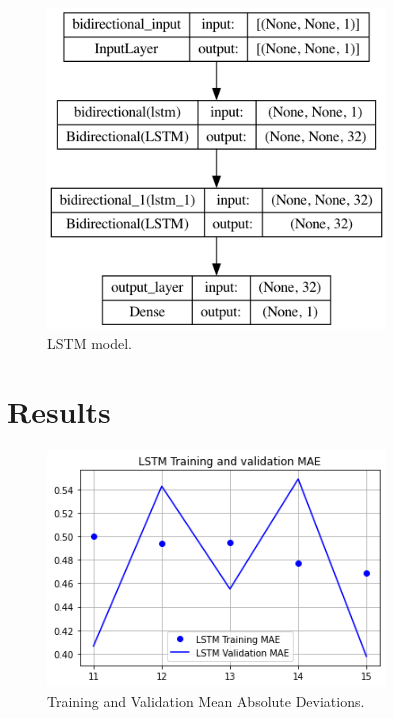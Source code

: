 \documentclass[twoside]{article}
\begin{document}
\begin{figure}
\centering
\includegraphics[width=0.8\textwidth]{2.png}
\caption[]{ 
  LSTM model. 
  }
\vspace{1mm}
\label{z2}
\end{figure}

\section{\label{sec3}Results}

\begin{figure}
\centering
\includegraphics[width=0.8\textwidth]{3.png}
\caption[]{ 
  Training and Validation Mean Absolute Deviations.
  }
\vspace{1mm}
\label{z3}
\end{figure}
\end{document}
